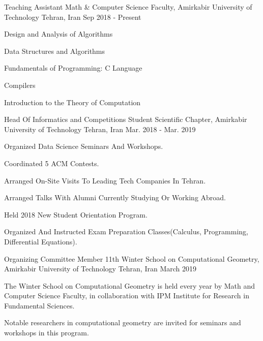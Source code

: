 \documentclass[11pt, a4paper]{awesome-cv}
\begin{document}
\begin{cventries}
	
	\cventry
	{Teaching Assistant} %
	{Math \& Computer Science Faculty, Amirkabir University of Technology} %
	{Tehran, Iran} %
	{Sep 2018 - Present} %
	{
		\begin{cvitems} %
			\item {Design and Analysis of Algorithms}
			\item {Data Structures and Algorithms}
			\item {Fundamentals of Programming: C Language}
			\item {Compilers}
			\item {Introduction to the Theory of Computation}
		\end{cvitems}
	}
	
	\cventry
	{Head Of Informatics and Competitions} %
	{Student Scientific Chapter, Amirkabir University of Technology} %
	{Tehran, Iran} %
	{Mar. 2018 - Mar. 2019} %
	{
		\begin{cvitems} %
			\item {Organized Data Science Seminars And Workshops.}
			\item {Coordinated 5 ACM Contests.}
			\item {Arranged On-Site Visits To Leading Tech Companies In Tehran.}
			\item {Arranged Talks With Alumni Currently Studying Or Working Abroad.}
			\item {Held 2018 New Student Orientation Program.}
			\item {Organized And Instructed Exam Preparation Classes(Calculus, Programming, Differential Equations).}
		\end{cvitems}
	}
	
	\cventry
	{Organizing Committee Member} %
	{11th Winter School on Computational Geometry, Amirkabir University of Technology} %
	{Tehran, Iran} %
	{March 2019} %
	{
		\begin{cvitems} %
			\item 	{The Winter School on Computational Geometry is held every year by Math and Computer Science Faculty, in collaboration with IPM Institute for Research in Fundamental Sciences.}
			\item {Notable researchers in computational geometry are invited for seminars and workshops in this program.}
		\end{cvitems}
	}
	
\end{cventries}



\end{document}
